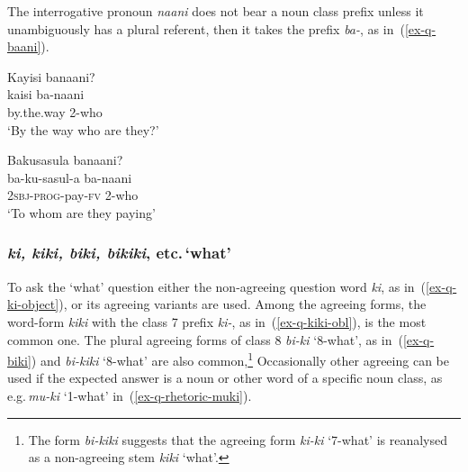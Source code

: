 The interrogative pronoun \emph{naani} does not bear a noun class prefix unless it unambiguously has a plural referent, then it takes the prefix \emph{ba-}, as in~(\ref{ex-q-baani}).

\ea \label{ex-q-baani}
\begin{xlist}
\ex 
	\glll Kayisi banaani?\\
	 kaisi ba-naani\\
		by.the.way 2-who\\
	\glt `By the way who are they?'

\ex 
	\glll Bakusasula banaani?\\
	 ba-ku-sasul-a ba-naani\\
		\textsc{2sbj}-\textsc{prog}-pay-\textsc{fv} 2-who\\
	\glt `To whom are they paying'
\end{xlist}
\z


\subsubsection{\emph{ki, kiki, biki, bikiki}, etc.\,`what'}  

To ask the `what' question either the non-agreeing question word \emph{ki}, as in~(\ref{ex-q-ki-object}), or its agreeing variants are used.
Among the agreeing forms, the word-form \emph{kiki} with the class 7 prefix \emph{ki-}, as in~(\ref{ex-q-kiki-obl}), is the most common one. 
The plural agreeing forms of class 8 \emph{bi-ki} `8-what', as in~(\ref{ex-q-biki}) and \emph{bi-kiki} `8-what' are also common,\footnote{The form \emph{bi-kiki} suggests that the agreeing form \emph{ki-ki} `7-what' is reanalysed as a non-agreeing stem \emph{kiki} `what'.}
Occasionally other agreeing can be used if the expected answer is a noun or other word of a specific noun class, as e.g.\,\emph{mu-ki} `1-what' in~(\ref{ex-q-rhetoric-muki}). 

